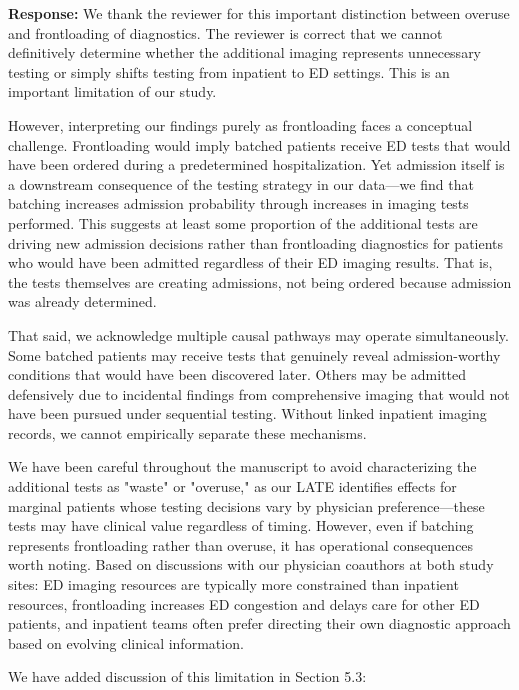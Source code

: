 \documentclass[11pt]{article}
\newcommand{\1}{\hbox{\rm 1\kern-.35em 1}}
\begin{document}
\noindent\textbf{Response:} \color{blue}We thank the reviewer for this important distinction between overuse and frontloading of diagnostics. The reviewer is correct that we cannot definitively determine whether the additional imaging represents unnecessary testing or simply shifts testing from inpatient to ED settings. This is an important limitation of our study.

However, interpreting our findings purely as frontloading faces a conceptual challenge. Frontloading would imply batched patients receive ED tests that would have been ordered during a predetermined hospitalization. Yet admission itself is a downstream consequence of the testing strategy in our data—we find that batching increases admission probability through increases in imaging tests performed. This suggests at least some proportion of the additional tests are driving new admission decisions rather than frontloading diagnostics for patients who would have been admitted regardless of their ED imaging results. That is, the tests themselves are creating admissions, not being ordered because admission was already determined.

That said, we acknowledge multiple causal pathways may operate simultaneously. Some batched patients may receive tests that genuinely reveal admission-worthy conditions that would have been discovered later. Others may be admitted defensively due to incidental findings from comprehensive imaging that would not have been pursued under sequential testing. Without linked inpatient imaging records, we cannot empirically separate these mechanisms.

We have been careful throughout the manuscript to avoid characterizing the additional tests as "waste" or "overuse," as our LATE identifies effects for marginal patients whose testing decisions vary by physician preference—these tests may have clinical value regardless of timing. However, even if batching represents frontloading rather than overuse, it has operational consequences worth noting. Based on discussions with our physician coauthors at both study sites: ED imaging resources are typically more constrained than inpatient resources, frontloading increases ED congestion and delays care for other ED patients, and inpatient teams often prefer directing their own diagnostic approach based on evolving clinical information.

We have added discussion of this limitation in Section 5.3:
\end{document}

